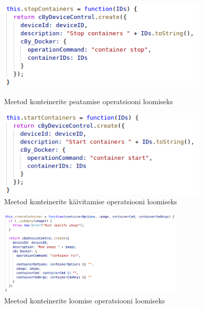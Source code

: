 \documentclass[12pt]{article}
\begin{document}
 \begin{figure} [ht]
  \centering
  \begin{minipage}{0.45\textwidth}
    \centering
    \includegraphics[width=0.9\textwidth]{webplugin_stopcontainers} %
    \caption{Meetod konteinerite peatamise operatsiooni loomiseks}
    \label{fig:webplugin_stopcontainers}
  \end{minipage}\hfill
  \begin{minipage}{0.45\textwidth}
    \centering
    \includegraphics[width=0.9\textwidth]{webplugin_startcontainers} %
    \caption{Meetod konteinerite käivitamise operatsiooni loomiseks}
    \label{fig:webplugin_startcontainers}
  \end{minipage}
 \end{figure}
  
 \FloatBarrier
 
 \begin{figure} [ht] %
 \begin{center}
 \includegraphics[width=0.8\textwidth]{webplugin_createcontainer}
 \caption{Meetod konteinerite loomise operatsiooni loomiseks}
 \label{fig:webplugin_createcontainer}
 \end{center}
 \end{figure}
 
\end{document}
